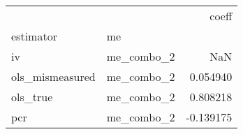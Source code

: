 \begin{tabular}{llr}
\toprule
    &            &     coeff \\
estimator & me &           \\
\midrule
iv & me\_combo\_2 &       NaN \\
ols\_mismeasured & me\_combo\_2 &  0.054940 \\
ols\_true & me\_combo\_2 &  0.808218 \\
pcr & me\_combo\_2 & -0.139175 \\
\bottomrule
\end{tabular}

